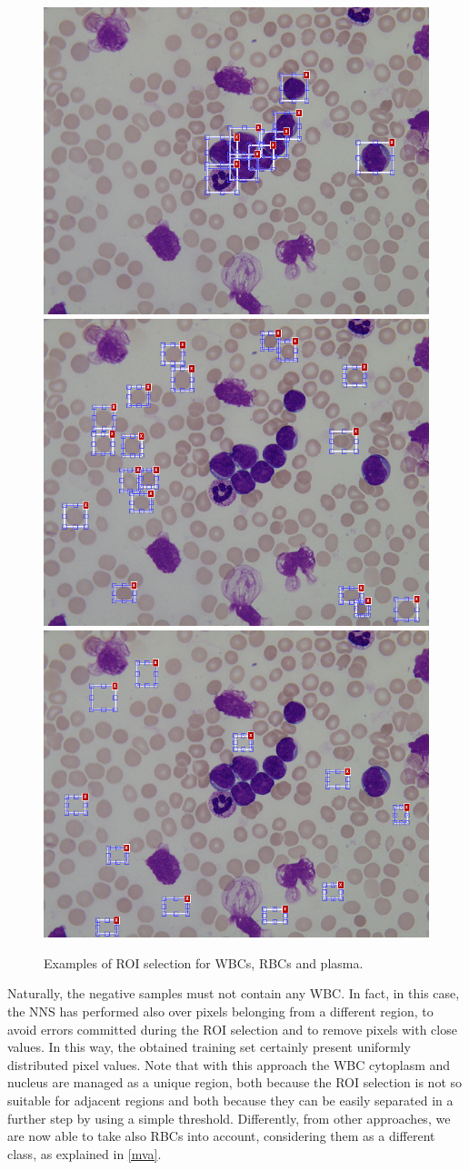 \documentclass[final,a4paper,12pt,english]{UnicaPhdThesis3}
\begin{document}
{\begin{figure}[h]
	\centering
	\includegraphics[height=0.25\textwidth]{images/2015_1_caip/ROI1}
	\includegraphics[height=0.25\textwidth]{images/2015_1_caip/ROI2}
	\includegraphics[height=0.25\textwidth]{images/2015_1_caip/ROI3}
	\caption{\label{fig:ex6}Examples of ROI selection for WBCs, RBCs and plasma.}
\end{figure}

Naturally, the negative samples must not contain any WBC. In fact, in this case, the NNS has performed also over pixels belonging from a different region, to avoid errors committed during the ROI selection and to remove pixels with close values. In this way, the obtained training set certainly present uniformly distributed pixel values. Note that with this approach the WBC cytoplasm and nucleus are managed as a unique region, both because the ROI selection is not so suitable for adjacent regions and both because they can be easily separated in a further step by using a simple threshold. Differently, from other approaches, we are now able to take also RBCs into account, considering them as a different class, as explained in \ref{mva}.

}
\end{document}
